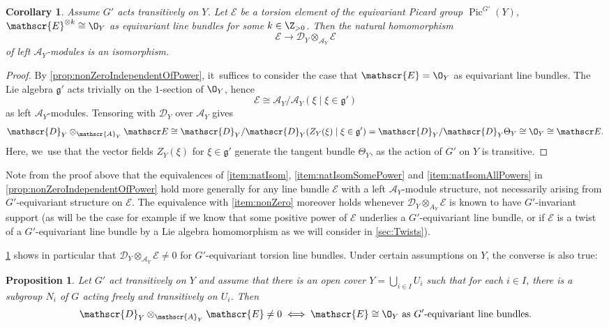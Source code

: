\documentclass[JEP,XML,SOM,Unicode,published]{cedram}
\newtheorem{prop}[thm]{Proposition}
\newtheorem{cor}[thm]{Corollary}
\newcommand{\cA}{\mathscr{A}}
\newcommand{\frg}{\mathfrak{g}}
\DeclareMathOperator{\Pic}{Pic}
\begin{document}
\begin{cor} \label{prop:torsionGivesNonZero}
Assume $G'$ acts transitively on $Y$. Let $\mathscr{E}$ be a torsion element of the equivariant Picard group $\Pic^{G'}(Y)$, \ie $\mathscr{E}^{\otimes k} \cong \O_Y$ as equivariant line bundles for some $k \in \Z_{>0}$. Then
the natural homomorphism
\[
\mathscr{E} \to \mathscr{D}_Y \otimes_{\cA_Y} \mathscr{E}
\]
of left $\cA_Y$\nobreakdash-mod\-ules is an isomorphism.
\end{cor}

\begin{proof}
By \cref{prop:nonZeroIndependentOfPower}, it~suffices to consider the case that $\mathscr{E} = \O_Y$ as equivariant line bundles. The Lie algebra $\frg'$ acts trivially on the $1$-section of $\O_Y$, hence
\[
\mathscr E \cong \cA_Y/\cA_Y(\xi \mid \xi \in \frg')
\]
as left $\cA_Y$\nobreakdash-mod\-ules. Tensoring with $\mathscr{D}_Y$ over $\cA_Y$ gives
\[
\mathscr{D}_Y \otimes_{\cA_Y} \mathscr E \cong \mathscr{D}_Y/\mathscr{D}_Y(Z_Y(\xi) \mid \xi \in \frg') = \mathscr{D}_Y/\mathscr{D}_Y \Theta_Y \cong \O_Y \cong \mathscr E.
\]
Here, we~use that the vector fields $Z_Y(\xi)$ for $\xi \in \frg'$ generate the tangent bundle $\Theta_Y$, as the action of $G'$ on $Y$ is transitive.
\end{proof}

\begin{rmk} \label{rem:torsionGivesNonZero}
Note from the proof above that the equivalences of \eqref{item:natIsom}, \eqref{item:natIsomSomePower} and \eqref{item:natIsomAllPowers} in \cref{prop:nonZeroIndependentOfPower} hold more generally for any line bundle $\mathscr{E}$ with a left $\cA_Y$\nobreakdash-mod\-ule structure, not necessarily arising from $G'$-equivariant structure on $\mathscr{E}$. The equivalence with \eqref{item:nonZero} moreover holds whenever $\mathscr D_Y \otimes_{A_Y} \mathscr E$ is known to have $G'$-invariant support (as will be the case for example if we know that some positive power of $\mathscr E$ underlies a $G'$-equivariant line bundle, or if $\mathscr E$ is a twist of a $G'$-equivariant line bundle by a Lie algebra homomorphism as we will consider in \cref{sec:Twists}).
\end{rmk}

\cref{prop:torsionGivesNonZero} shows in particular that $\mathscr{D}_Y \otimes_{\cA_Y} \mathscr{E} \neq 0$ for $G'$-equivariant torsion line bundles. Under certain assumptions on $Y$, the converse is also true:

\begin{prop} \label{prop:nonTorsionGivesZero}
Let $G'$ act transitively on $Y$ and assume that there is an open cover $Y = \bigcup_{i \in I} U_i$ such that for each $i \in I$, there is a subgroup $N_i$ of $G$ acting freely and transitively on $U_i$. Then
\[
\mathscr{D}_Y \otimes_{\cA_Y} \mathscr{E} \neq 0
\iff
\mathscr{E} \cong \O_Y \text{ as $G'$-equivariant line bundles}.
\]
\end{prop}
\end{document}
